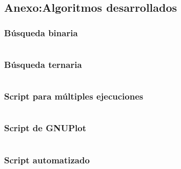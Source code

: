 \documentclass[12pt,spanish]{article}
\begin{document}
\newpage
\subsection{Anexo:Algoritmos desarrollados}

\subsubsection{Búsqueda binaria}

\inputminted[linenos, fontsize=\footnotesize]{c++}{busqueda_binaria.cpp}

\newpage
\subsubsection{Búsqueda ternaria}

\inputminted[linenos, fontsize=\footnotesize]{c++}{busqueda_ternaria.cpp}


\subsubsection{Script para múltiples ejecuciones}
\label{script}

\inputminted[linenos, fontsize=\footnotesize]{bash}{individual.sh}

\subsubsection{Script de GNUPlot}

\inputminted[linenos, fontsize=\footnotesize]{bash}{gnuplot.sh}

\subsubsection{Script automatizado}

\inputminted[linenos, fontsize=\footnotesize]{bash}{all.sh}
\end{document}
